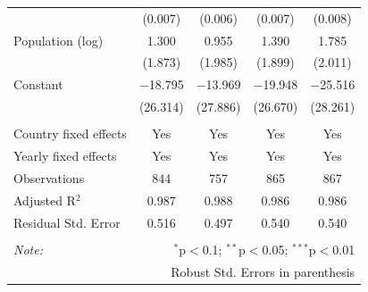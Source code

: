 \documentclass[10pt,letterpaper]{article}
\begin{document}
\begin{table}[!htbp]
\begin{tabular}{@{\extracolsep{1pt}}lcccc}
  & (0.007) & (0.006) & (0.007) & (0.008) \\ 
  Population (log) & 1.300 & 0.955 & 1.390 & 1.785 \\ 
  & (1.873) & (1.985) & (1.899) & (2.011) \\ 
  Constant & $-$18.795 & $-$13.969 & $-$19.948 & $-$25.516 \\ 
  & (26.314) & (27.886) & (26.670) & (28.261) \\ 
 \hline \\[-1.8ex] 
Country fixed effects & Yes & Yes & Yes & Yes \\ 
Yearly fixed effects & Yes & Yes & Yes & Yes \\ 
Observations & 844 & 757 & 865 & 867 \\ 
Adjusted R$^{2}$ & 0.987 & 0.988 & 0.986 & 0.986 \\ 
Residual Std. Error & 0.516 & 0.497 & 0.540 & 0.540 \\ 
\hline 
\hline \\[-1.8ex] 
\textit{Note:}  & \multicolumn{4}{r}{$^{*}$p$<$0.1; $^{**}$p$<$0.05; $^{***}$p$<$0.01} \\ 
 & \multicolumn{4}{r}{Robust Std. Errors in parenthesis} \\ 
\end{tabular} 
\end{table}
\end{document}
